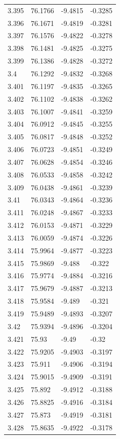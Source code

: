 \begin{tabular}{llll}
3.395 & 76.1766 & -9.4815 & -0.3285 \\
3.396 & 76.1671 & -9.4819 & -0.3281 \\
3.397 & 76.1576 & -9.4822 & -0.3278 \\
3.398 & 76.1481 & -9.4825 & -0.3275 \\
3.399 & 76.1386 & -9.4828 & -0.3272 \\
3.4 & 76.1292 & -9.4832 & -0.3268 \\
3.401 & 76.1197 & -9.4835 & -0.3265 \\
3.402 & 76.1102 & -9.4838 & -0.3262 \\
3.403 & 76.1007 & -9.4841 & -0.3259 \\
3.404 & 76.0912 & -9.4845 & -0.3255 \\
3.405 & 76.0817 & -9.4848 & -0.3252 \\
3.406 & 76.0723 & -9.4851 & -0.3249 \\
3.407 & 76.0628 & -9.4854 & -0.3246 \\
3.408 & 76.0533 & -9.4858 & -0.3242 \\
3.409 & 76.0438 & -9.4861 & -0.3239 \\
3.41 & 76.0343 & -9.4864 & -0.3236 \\
3.411 & 76.0248 & -9.4867 & -0.3233 \\
3.412 & 76.0153 & -9.4871 & -0.3229 \\
3.413 & 76.0059 & -9.4874 & -0.3226 \\
3.414 & 75.9964 & -9.4877 & -0.3223 \\
3.415 & 75.9869 & -9.488 & -0.322 \\
3.416 & 75.9774 & -9.4884 & -0.3216 \\
3.417 & 75.9679 & -9.4887 & -0.3213 \\
3.418 & 75.9584 & -9.489 & -0.321 \\
3.419 & 75.9489 & -9.4893 & -0.3207 \\
3.42 & 75.9394 & -9.4896 & -0.3204 \\
3.421 & 75.93 & -9.49 & -0.32 \\
3.422 & 75.9205 & -9.4903 & -0.3197 \\
3.423 & 75.911 & -9.4906 & -0.3194 \\
3.424 & 75.9015 & -9.4909 & -0.3191 \\
3.425 & 75.892 & -9.4912 & -0.3188 \\
3.426 & 75.8825 & -9.4916 & -0.3184 \\
3.427 & 75.873 & -9.4919 & -0.3181 \\
3.428 & 75.8635 & -9.4922 & -0.3178 \\

\end{tabular}

